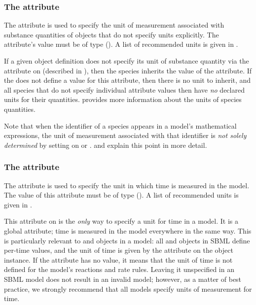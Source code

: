 \subsubsection{The  attribute}
\label{sec:model-substanceUnits}
\label{sec:substanceunits}

The  attribute is used to specify the unit
of measurement associated with substance quantities of \Species
objects that do not specify units explicitly.  The attribute's
value must be of type 
().  A list of recommended units is
given in .

If a given \Species object definition does not specify its unit of
substance quantity via the  attribute on
\Species (described in ), then the
species inherits the value of the \Model {}
attribute.  If the \Model does not define a value for this
attribute, then there is no unit to inherit, and all species that
do not specify individual  attribute values
then have \emph{no} declared units for their quantities.
 provides more information
about the units of species quantities.

Note that when the identifier of a species appears in a model's
mathematical expressions, the unit of measurement associated with
that identifier is \emph{not solely determined} by setting
 on \Model or \Species.
 and 
explain this point in more detail.


\subsubsection{The  attribute}
\label{sec:model-timeUnits}
\label{sec:timeunits}

The  attribute is used to specify the unit in
which time is measured in the model.  The value of this attribute
must be of type 
().  A list of recommended units is
given in .

This attribute on \Model is the \emph{only} way to specify a unit
for time in a model.  It is a global attribute; time is measured
in the model everywhere in the same way.  This is particularly
relevant to \Reaction and \RateRule objects in a model: all
\Reaction and \RateRule objects in SBML define per-time values,
and the unit of time is given by the  attribute
on the \Model object instance.  If the \Model {}
attribute has no value, it means that the unit of time is not
defined for the model's reactions and rate rules.  Leaving it
unspecified in an SBML model does not result in an invalid model;
however, as a matter of best practice, we strongly recommend that
all models specify units of measurement for time.


